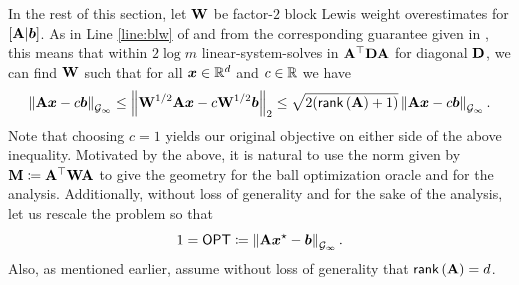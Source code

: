 In the rest of this section, let $\mathbf{W}$ be factor-$2$ block Lewis weight overestimates for $\left[\mathbf{A} \vert \bm{b}\right]$. As in Line \ref{line:blw} of  and from the corresponding guarantee given in \cite[Lemmas 5.6, 5.8]{mo23}, this means that within $2\log m$ linear-system-solves in $\mathbf{A}^{\top}\mathbf{D}\mathbf{A}$ for diagonal $\mathbf{D}$, we can find $\mathbf{W}$ such that for all $\bm{x}\in\mathbb{R}^d$ and $c\in\mathbb{R}$ we have
\begin{align*}
    \left\lVert \mathbf{A}\bm{x}-c\bm{b} \right\rVert_{\mathcal{G}_{\infty}} \le \left\lVert \mathbf{W}^{1/2}\mathbf{A}\bm{x}-c\mathbf{W}^{1/2}\bm{b} \right\rVert_2 \le \sqrt{2(\mathsf{rank}\left(\mathbf{A}\right)+1)}\left\lVert \mathbf{A}\bm{x}-c\bm{b} \right\rVert_{\mathcal{G}_{\infty}}.
\end{align*}
Note that choosing $c=1$ yields our original objective on either side of the above inequality. Motivated by the above, it is natural to use the norm given by $\mathbf{M} \coloneqq \mathbf{A}^{\top}\mathbf{W}\mathbf{A}$ to give the geometry for the ball optimization oracle and for the analysis. Additionally, without loss of generality and for the sake of the analysis, let us rescale the problem so that
\begin{align*}
    1 = \mathsf{OPT} \coloneqq \left\lVert \mathbf{A}\bm{x}^{\star}-\bm{b} \right\rVert_{\mathcal{G}_{\infty}}.
\end{align*}
Also, as mentioned earlier, assume without loss of generality that $\mathsf{rank}\left(\mathbf{A}\right) = d$.

